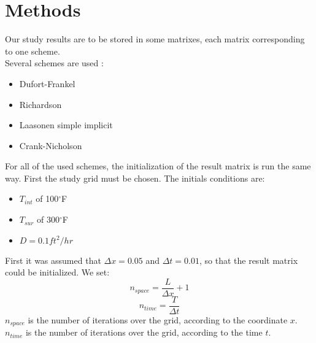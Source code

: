 \documentclass{article}
\begin{document}
        \section{Methods}
            Our study results are to be stored in some matrixes, each matrix corresponding to one scheme.\\
            Several schemes are used :
            \begin{itemize}
                \item{Dufort-Frankel}
                \item{Richardson}
                \item{Laasonen simple implicit}
                \item{Crank-Nicholson}
            \end{itemize}
            For all of the used schemes, the initialization of the result matrix is run the same way.
            First the study grid must be chosen. The initials conditions are:
            \begin{itemize}
                \item{$T_{int}$ of 100$^{\circ}$F}
                \item{$T_{sur}$ of 300$^{\circ}$F}
                \item{$D = 0.1 ft^{2}/hr$}
            \end{itemize}
            First it was assumed that $\Delta x = 0.05$ and $\Delta t = 0.01$,
            so that the result matrix could be initialized.
            We set:
            \begin{equation}
                n_{space} = \frac{L}{\Delta x} + 1
            \end{equation}
            \begin{equation}
                n_{time} = \frac{T}{\Delta t}
            \end{equation}
            $n_{space}$ is the number of iterations over the grid, according to the coordinate $x$. \\
            $n_{time}$ is the number of iterations over the grid, according to the time $t$. \\
            
\end{document}
